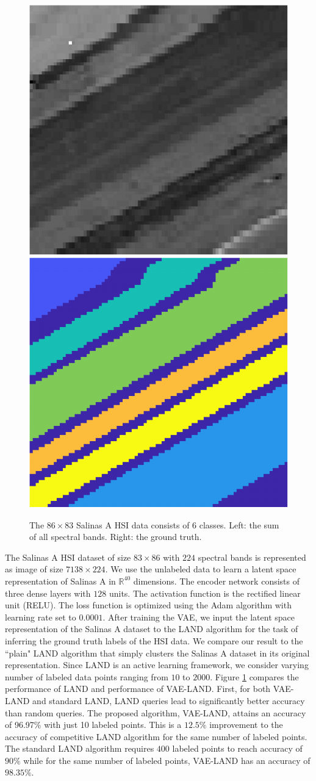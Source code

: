 \documentclass{article}
\def\R{{\mathbb R}}
\begin{document}
\begin{figure}[htb]
\includegraphics[width=.23\textwidth,clip]{Images/SalinasA_BandSum-crop.pdf}
\includegraphics[width=.23\textwidth,clip]{Images/SalinasA_GT-crop.pdf}
\caption{\small{The $86\times 83$ Salinas A HSI data consists of 6 classes.  Left: the sum of all spectral bands.  Right: the ground truth.}}
\label{fig:SalinasA}
\end{figure}
The Salinas A HSI dataset of size $83 \times 86$ with $224$ spectral bands is represented as image of size $7138\times 224$. We use the unlabeled data to learn a latent space representation of Salinas A in $\R^{40}$ dimensions. The encoder network consists of three dense layers with $128$ units. The activation function is the rectified linear unit (RELU). The loss function is optimized using the Adam algorithm with learning rate set to $0.0001$. After training the VAE, we input the latent space representation of the Salinas A dataset to the LAND algorithm for the task of inferring the ground truth labels of the HSI data. We compare our result to the ``plain" LAND algorithm that simply clusters the Salinas A dataset in its original representation. Since LAND is an active learning framework, we consider varying number of labeled data points ranging from $10$ to $2000$. Figure \ref{fig:SalinasA} compares the performance of LAND and performance of VAE-LAND. First, for both VAE-LAND and standard LAND, LAND queries lead to significantly better accuracy than random queries. The proposed algorithm, VAE-LAND, attains an accuracy of 96.97\% with just 10 labeled points. This is a $12.5\%$ improvement to the accuracy of competitive LAND algorithm for the same number of labeled points. The standard LAND algorithm requires $400$ labeled points to reach accuracy of $90\%$ while for the same number of labeled points, VAE-LAND has an accuracy of $98.35\%$. 
\end{document}
